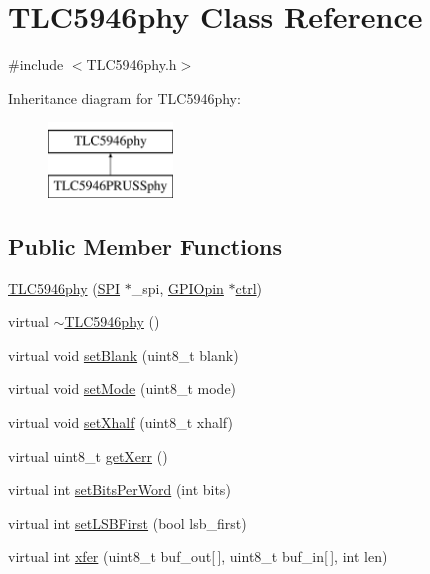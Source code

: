 \hypertarget{class_t_l_c5946phy}{\section{T\-L\-C5946phy Class Reference}
\label{class_t_l_c5946phy}
}


{\ttfamily \#include $<$T\-L\-C5946phy.\-h$>$}

Inheritance diagram for T\-L\-C5946phy\-:\begin{figure}[H]
\begin{center}
\leavevmode
\includegraphics[height=2.000000cm]{class_t_l_c5946phy}
\end{center}
\end{figure}
\subsection*{Public Member Functions}
\begin{DoxyCompactItemize}
\item 
\hyperlink{class_t_l_c5946phy_acd5f2ca20ca8916c23625aca73306415}{T\-L\-C5946phy} (\hyperlink{class_s_p_i}{S\-P\-I} $\ast$\-\_\-spi, \hyperlink{class_g_p_i_opin}{G\-P\-I\-Opin} $\ast$\hyperlink{class_t_l_c5946phy_ad593ca4b96986ce8e40c833ed5ed3769}{ctrl})
\item 
virtual \hyperlink{class_t_l_c5946phy_a7ed74634384c99c3b305e0c33d9ec47b}{$\sim$\-T\-L\-C5946phy} ()
\item 
virtual void \hyperlink{class_t_l_c5946phy_a917d05cee794f633a6775b8c509efba0}{set\-Blank} (uint8\-\_\-t blank)
\item 
virtual void \hyperlink{class_t_l_c5946phy_a43974eb64479ebd593ea122e5f446ffa}{set\-Mode} (uint8\-\_\-t mode)
\item 
virtual void \hyperlink{class_t_l_c5946phy_a11b29859983d81add34d6fb0721613a2}{set\-Xhalf} (uint8\-\_\-t xhalf)
\item 
virtual uint8\-\_\-t \hyperlink{class_t_l_c5946phy_ac57ced207378247e87f025e3cb94d754}{get\-Xerr} ()
\item 
virtual int \hyperlink{class_t_l_c5946phy_a0604df91a14451f72504f39cd379eed1}{set\-Bits\-Per\-Word} (int bits)
\item 
virtual int \hyperlink{class_t_l_c5946phy_a7f12198f25476c730e6838cfcd94c388}{set\-L\-S\-B\-First} (bool lsb\-\_\-first)
\item 
virtual int \hyperlink{class_t_l_c5946phy_a142002ef92f3bb22579e63b9110e6a30}{xfer} (uint8\-\_\-t buf\-\_\-out\mbox{[}$\,$\mbox{]}, uint8\-\_\-t buf\-\_\-in\mbox{[}$\,$\mbox{]}, int len)
\end{DoxyCompactItemize}
